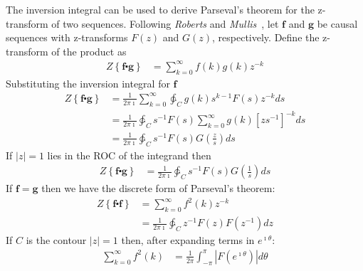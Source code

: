 \documentclass[a4paper,twoside,10pt,english]{report}
\begin{document}
The inversion integral can be used to derive Parseval's theorem for the 
z-transform of two sequences. Following \emph{Roberts} and
\emph{Mullis}~\cite[Section 3.4]{RobertsMullis_DigitalSignalProcessing}, let 
$\boldsymbol{f}$ and $\boldsymbol{g}$ be causal sequences with z-transforms
$F\left(z\right)$ and $G\left(z\right)$, respectively. Define the z-transform
of the product as
\begin{align*}
Z\left\{\boldsymbol{f}  \centerdot \boldsymbol{g}\right\} &=
\sum_{k=0}^{\infty} f\left(k\right)g\left(k\right)z^{-k}
\end{align*}
Substituting the inversion integral for $\boldsymbol{f}$
\begin{align*}
Z\left\{\boldsymbol{f}  \centerdot \boldsymbol{g}\right\} &=
\frac{1}{2\pi\imath}\sum_{k=0}^{\infty} 
\ointctrclockwise_{C}g\left(k\right)s^{k-1}F\left(s\right)z^{-k}ds \\
&=\frac{1}{2\pi\imath}\ointctrclockwise_{C}s^{-1}F\left(s\right)
\sum_{k=0}^{\infty} g\left(k\right){\left[zs^{-1}\right]}^{-k}ds \\
&= \frac{1}{2\pi\imath}\ointctrclockwise_{C}
s^{-1}F\left(s\right)G\left(\frac{z}{s}\right)ds
\end{align*}
If $\left|z\right|=1$ lies in the ROC of the integrand then
\begin{align*}
Z\left\{\boldsymbol{f}  \centerdot \boldsymbol{g}\right\} &=
\frac{1}{2\pi\imath}\ointctrclockwise_{C}
s^{-1}F\left(s\right)G\left(\frac{1}{s}\right)ds
\end{align*}
If $\boldsymbol{f}=\boldsymbol{g}$ then we have the discrete form of 
Parseval's theorem:
\begin{align*}
Z\left\{\boldsymbol{f}  \centerdot \boldsymbol{f}\right\} &=
\sum_{k=0}^{\infty} f^{2}\left(k\right)z^{-k} \\
&= \frac{1}{2\pi\imath}\ointctrclockwise_{C}
z^{-1}F\left(z\right)F\left(z^{-1}\right)dz
\end{align*}
If $C$ is the contour $\left|z\right|=1$ then, after expanding terms in
$e^{\imath\theta}$:
\begin{align*}
\sum_{k=0}^{\infty} f^{2}\left(k\right) &=
 \frac{1}{2\pi}\int_{-\pi}^{\pi}\left|F\left(e^{\imath\theta}\right)\right|d\theta
\end{align*}
\end{document}
